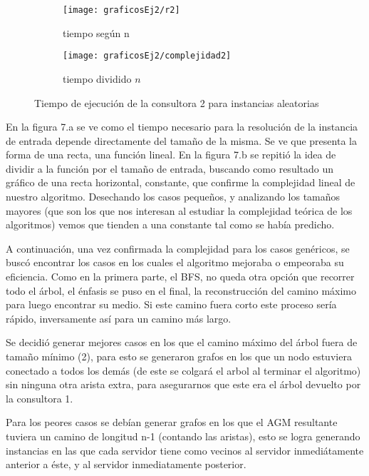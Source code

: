 \documentclass[A4paper,oneside,fleqn,11pt]{article}
\theoremstyle{definition}
\begin{document}
\begin{figure}[H] %
    \begin{subfigure}[b]{0.45\textwidth}
        \texttt{[image: graficosEj2/r2]}
        \caption[center]{tiempo según n}
        \label{ni se pa que sirve esto}
    \end{subfigure}
    \begin{subfigure}[b]{0.45\textwidth}
        \texttt{[image: graficosEj2/complejidad2]}
        \caption{tiempo dividido $n$}
        \label{ni se pa que sirve esto}
    \end{subfigure}
    \caption{Tiempo de ejecución de la consultora 2 para instancias aleatorias}
\end{figure}

En la figura 7.a se ve como el tiempo necesario para la resolución de la instancia de entrada depende directamente del tamaño de la misma. Se ve que presenta la forma de una recta, una función lineal. En la figura 7.b se repitió la idea de dividir a la función por el tamaño de entrada, buscando como resultado un gráfico de una recta horizontal, constante, que confirme la complejidad lineal de nuestro algoritmo. Desechando los casos pequeños, y analizando los tamaños mayores (que son los que nos interesan al estudiar la complejidad teórica de los algoritmos) vemos que tienden a una constante tal como se había predicho.

A continuación, una vez confirmada la complejidad para los casos genéricos, se buscó encontrar los casos en los cuales el algoritmo mejoraba o empeoraba su eficiencia. Como en la primera parte, el BFS, no queda otra opción que recorrer todo el árbol, el énfasis se puso en el final, la reconstrucción del camino máximo para luego encontrar su medio. Si este camino fuera corto este proceso sería rápido, inversamente así para un camino más largo.

Se decidió generar mejores casos en los que el camino máximo del árbol fuera de tamaño mínimo (2), para esto se generaron grafos en los que un nodo estuviera conectado a todos los demás (de este se colgará el arbol al terminar el algoritmo) sin ninguna otra arista extra, para asegurarnos que este era el árbol devuelto por la consultora 1.

Para los peores casos se debían generar grafos en los que el AGM resultante tuviera un camino de longitud n-1 (contando las aristas), esto se logra generando instancias en las que cada servidor tiene como vecinos al servidor inmediátamente anterior a éste, y al servidor inmediatamente posterior.
\end{document}
